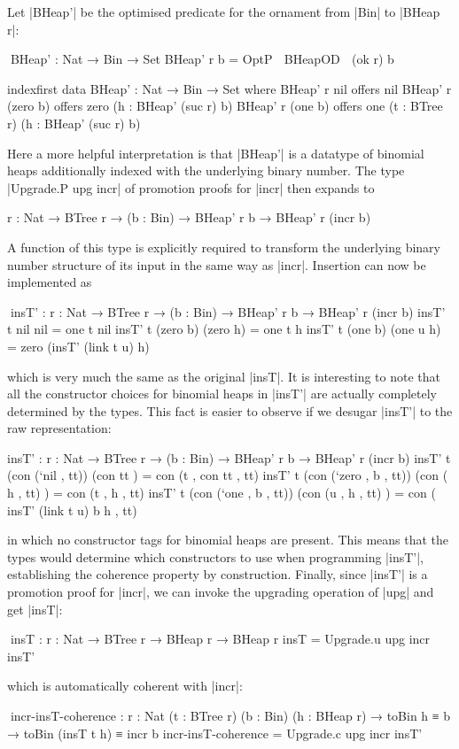 Let |BHeap'| be the optimised predicate for the ornament from |Bin| to |BHeap r|:
\begin{code}
^^^BHeap' : Nat → Bin → Set
BHeap' r b = OptP ⌈ BHeapOD ⌉ (ok r) b

indexfirst data BHeap' : Nat → Bin → Set where
  BHeap' r nil        offers  nil
  BHeap' r (zero  b)  offers  zero  (h : BHeap' (suc r) b)
  BHeap' r (one   b)  offers  one   (t : BTree r) (h : BHeap' (suc r) b)
\end{code}
Here a more helpful interpretation is that |BHeap'| is a datatype of binomial heaps additionally indexed with the underlying binary number.
The type |Upgrade.P upg incr| of promotion proofs for |incr| then expands to
\begin{code}
{r : Nat} → BTree r → (b : Bin) → BHeap' r b → BHeap' r (incr b)
\end{code}
A function of this type is explicitly required to transform the underlying binary number structure of its input in the same way as |incr|.
Insertion can now be implemented as
\begin{code}
^^^insT' : {r : Nat} → BTree r → (b : Bin) → BHeap' r b → BHeap' r (incr b)
insT' t nil        nil         = one t nil
insT' t (zero  b)  (zero   h)  = one t h
insT' t (one   b)  (one u  h)  = zero (insT' (link t u) h)
\end{code}
which is very much the same as the original |insT|.
It is interesting to note that all the constructor choices for binomial heaps in |insT'| are actually completely determined by the types.
This fact is easier to observe if we desugar |insT'| to the raw representation:
\begin{code}
insT' : {r : Nat} → BTree r → (b : Bin) → BHeap' r b → BHeap' r (incr b)
insT' t (con (`nil   ,      tt))  (con            tt   ) = con (t ,  con tt                , tt)
insT' t (con (`zero  , b ,  tt))  (con (     h ,  tt)  ) = con (t ,  h                     , tt)
insT' t (con (`one   , b ,  tt))  (con (u ,  h ,  tt)  ) = con (     insT' (link t u) b h  , tt)
\end{code}
in which no constructor tags for binomial heaps are present.
This means that the types would determine which constructors to use when programming |insT'|, establishing the coherence property by construction.
Finally, since |insT'| is a promotion proof for |incr|, we can invoke the upgrading operation of |upg| and get |insT|:
\begin{code}
^^^insT : {r : Nat} → BTree r → BHeap r → BHeap r
insT = Upgrade.u upg incr insT'
\end{code}
which is automatically coherent with |incr|:
\begin{code}
^^^incr-insT-coherence :  {r : Nat} (t : BTree r) (b : Bin) (h : BHeap r) →
                          toBin h ≡ b → toBin (insT t h) ≡ incr b
incr-insT-coherence = Upgrade.c upg incr insT'
\end{code}

